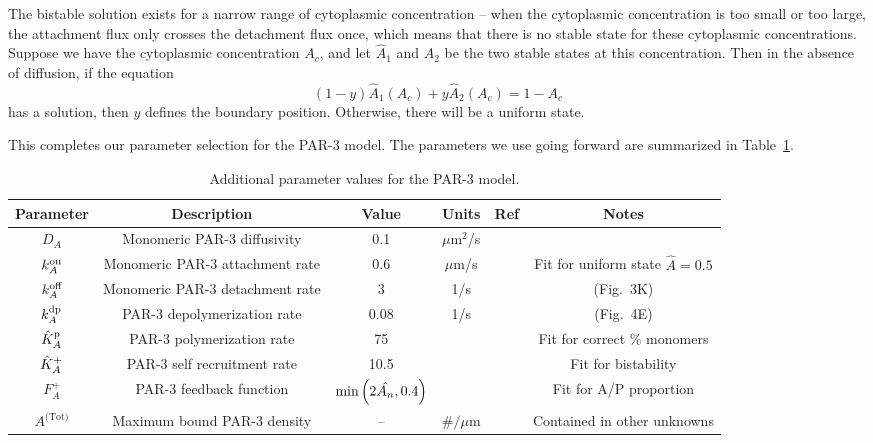 \documentclass[11pt]{article}
\newcommand{\6}[1]{#1_{\text{6}}}
\newcommand{\3}[1]{#1_{\text{3}}}
\newcommand{\Tot}[1]{#1^\text{(Tot)}}
\newcommand{\A}[1]{#1_A}
\begin{document}
The bistable solution exists for a narrow range of cytoplasmic concentration -- when the cytoplasmic concentration is too small or too large, the attachment flux only crosses the detachment flux once, which means that there is no stable state for these cytoplasmic concentrations. Suppose we have the cytoplasmic concentration $A_c$, and let $\hat A_1$ and $\hat A_2$ be the two stable states at this concentration. Then in the absence of diffusion, if the equation 
\begin{equation}
\label{eq:NoDiffEqn}
(1-y)\hat{A}_1\left(A_c\right)+y \hat{A}_2\left(A_c\right)=1-A_c
\end{equation}
has a solution, then $y$ defines the boundary position. Otherwise, there will be a uniform state.

This completes our parameter selection for the PAR-3 model. The parameters we use going forward are summarized in Table\ \ref{tab:paramsP3}.


\begin{table}
\begin{small}
\centering
\begin{tabular}{|c|c|c|c|c|c|}\hline
Parameter & Description & Value & Units & Ref & Notes \\ \hline
$\A{D} $ & Monomeric PAR-3 diffusivity & 0.1 & $\mu$m$^2$/s & \cite{lang2023oligomerization} & \\
$\A{\kon}$ & Monomeric PAR-3 attachment rate & 0.6 & $\mu$m/s & & Fit for uniform state $\hat A=0.5$ \\
$\A{\koff}$ & Monomeric PAR-3 detachment rate &  3& 1/s & \cite{lang2023oligomerization} & (Fig.\ 3K)\\
$\A{\kdp}$ & PAR-3 depolymerization rate & 0.08 & 1/s & \cite{lang2023oligomerization} & (Fig.\ 4E) \\
$\hat{K}^\text{p}_A$ & PAR-3 polymerization rate & 75 & & & Fit for correct \% monomers \cite{lang2023oligomerization}  \\
$\hat{K}^\text{+}_A$ & PAR-3 self recruitment rate &10.5 & & & Fit for bistability\\
$F_A^+$ & PAR-3 feedback function &$\text{min}\left(2\hat {A_n},0.4\right)$ &  &&  Fit for A/P proportion\\
$\Tot{A}$ & Maximum bound PAR-3 density & -- & $\#/\mu$m & & Contained in other unknowns \\ \hline
\end{tabular}
\caption{\label{tab:paramsP3}Additional parameter values for the PAR-3 model. }
\end{small}
\end{table}
\end{document}
